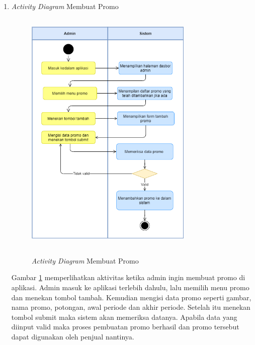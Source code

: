 \begin{enumerate}
	\newpage
	\item \textit{Activity Diagram} Membuat Promo
	\begin{figure}[H]
		\centering
		{\includegraphics [width = 8cm, height= 12cm]{gambar/activity diagram/buat promo}}
		\caption{\textit{Activity Diagram} Membuat Promo}
		\label{buat promo}
	\end{figure}
	\par Gambar \ref*{buat promo} memperlihatkan aktivitas ketika admin ingin membuat promo di aplikasi. Admin masuk ke aplikasi terlebih dahulu, lalu memilih menu promo dan menekan tombol tambah. Kemudian mengisi data promo seperti gambar, nama promo, potongan, awal periode dan akhir periode. Setelah itu menekan tombol submit maka sistem akan memeriksa datanya. Apabila data yang diinput valid maka proses pembuatan promo berhasil dan promo tersebut dapat digunakan oleh penjual nantinya.


\end{enumerate}
